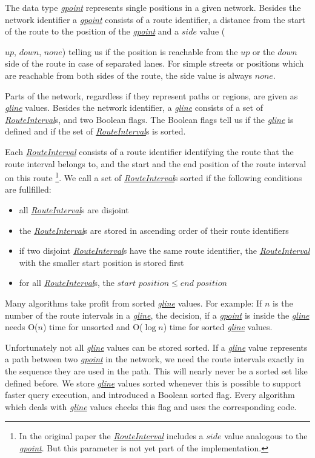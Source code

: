 \documentclass[a4paper]{article}
\newcommand{\dt}[1]{\textsl{\underline{#1}}}
\begin{document}
The data type \dt{gpoint} represents single positions in a given network. Besides the
network identifier a \dt{gpoint} consists of a route identifier, a distance from
the start of the route to the position of the \dt{gpoint} and a $side$ value
({$up$, $down$, $none$) telling us if the position is reachable from the $up$
or the $down$ side of the route in case of separated lanes. For simple
streets or positions which are reachable from both sides of the route, the side
value is always $none$.

Parts of the network, regardless if they represent paths or regions, are given as
\dt{gline} values. Besides the network identifier, a \dt{gline} consists of a set
of \dt{RouteInterval}s, and two Boolean flags. The Boolean flags tell us if the
\dt{gline} is defined and if the set of \dt{RouteInterval}s is sorted.

Each \dt{RouteInterval} consists of a route identifier identifying the route that
the route interval belongs to, and the start and the end position of the
route interval on this route
\footnote{In the original paper the \dt{RouteInterval} includes a $side$ value
analogous to the \dt{gpoint}. But this parameter is not yet part of the implementation.}.
We call a \label{sec:sortedgline} set of \dt{RouteInterval}s sorted if the following
conditions are fullfilled:
\begin{itemize}
   \item all \dt{RouteInterval}s are disjoint
   \item the \dt{RouteInterval}s are stored in ascending order of their route identifiers
   \item if two disjoint \dt{RouteInterval}s have the same route identifier, the
\dt{RouteInterval} with the smaller start position is stored first
   \item for all \dt{RouteInterval}s, the $start$ $position \le end$ $position$
\end{itemize}
Many algorithms take profit from sorted \dt{gline} values. For example: If $n$
is the number of the route intervals in a \dt{gline}, the
decision, if a \dt{gpoint} is inside the \dt{gline} needs O($n$) time for unsorted
and O($\log n$) time for sorted \dt{gline} values.

Unfortunately not all \dt{gline} values can be stored sorted. If a \dt{gline}
value represents a path between two \dt{gpoint} in the network, we need the
route intervals exactly in the sequence they are used in the path. This will
nearly never be a sorted set like defined before.  We store \dt{gline}
values sorted whenever this is possible to support faster query execution, and
introduced a Boolean sorted flag. Every algorithm which deals with \dt{gline} values
checks this flag and uses the corresponding code.

}
\end{document}
